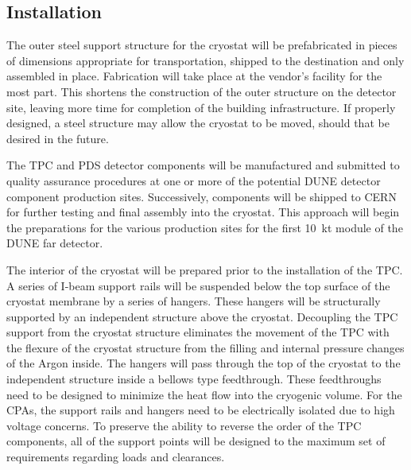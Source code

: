 



%

\subsection{Installation}

The outer steel support structure for the cryostat will be prefabricated in pieces of dimensions appropriate for transportation, shipped to the destination and only assembled in place.  Fabrication will take place at the vendor's facility for the most part. This shortens the construction of the outer structure on the detector site, leaving more time for completion of the building infrastructure. If properly designed, a steel structure may allow the cryostat to be moved, should that be desired in the future.

The TPC and PDS detector components will be manufactured and submitted to quality assurance procedures at one or more of the potential DUNE detector component production sites. Successively, components will be shipped to CERN for further testing and final assembly into the cryostat. This approach will begin the preparations for the various production sites for the first 10~kt module of the DUNE far detector.

The interior of the cryostat will be prepared prior to the installation of the TPC.  A series of I-beam support rails will be suspended below the top surface of the cryostat membrane by a series of hangers.  These hangers will be structurally supported by an independent structure above the cryostat.  Decoupling the TPC support from the cryostat structure eliminates the movement of the TPC with the flexure of the cryostat structure from the filling and internal pressure changes of the Argon inside.  The hangers will pass through the top of the cryostat to the independent structure inside a bellows type feedthrough.  These feedthroughs need to be designed to minimize the heat flow into the cryogenic volume.  For the CPAs, the support rails and hangers need to be electrically isolated due to high voltage concerns.  To preserve the ability to reverse the order of the TPC components, all of the support points will be designed to the maximum set of requirements regarding loads and clearances.  

